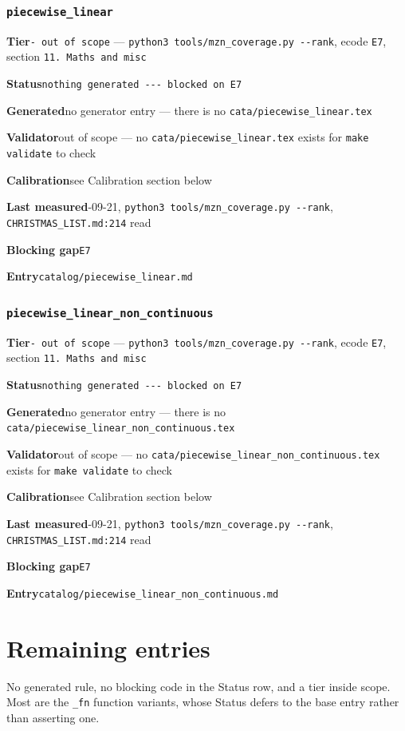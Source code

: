 \documentclass[10pt,a4paper]{article}
\newcommand{\entryfield}[2]{{\raggedright\textbf{#1}\quad #2\par}}
\begin{document}
\subsubsection*{\texttt{piecewise\_\allowbreak{}linear}}
\label{entry:piecewise-linear}
\entryfield{Tier}{\texttt{- out of scope} --- \texttt{python3 tools/\allowbreak{}mzn\_\allowbreak{}coverage.\allowbreak{}py -\allowbreak{}-\allowbreak{}rank}, ecode \texttt{E7}, section \texttt{11. Maths and misc}}
\entryfield{Status}{\texttt{nothing generated -\allowbreak{}-\allowbreak{}-\allowbreak{} blocked on E7}}
\entryfield{Generated}{no generator entry --- there is no \texttt{cata/\allowbreak{}piecewise\_\allowbreak{}linear.\allowbreak{}tex}}
\entryfield{Validator}{out of scope --- no \texttt{cata/\allowbreak{}piecewise\_\allowbreak{}linear.\allowbreak{}tex} exists for \texttt{make validate} to check}
\entryfield{Calibration}{see Calibration section below}
\entryfield{Last measured}{2026-09-21, \texttt{python3 tools/\allowbreak{}mzn\_\allowbreak{}coverage.\allowbreak{}py -\allowbreak{}-\allowbreak{}rank}, \texttt{CHRISTMAS\_LIST.md:214} read}
\entryfield{Blocking gap}{\texttt{E7}}
\entryfield{Entry}{\texttt{catalog/piecewise\_linear.md}}
\subsubsection*{\texttt{piecewise\_\allowbreak{}linear\_\allowbreak{}non\_\allowbreak{}continuous}}
\label{entry:piecewise-linear-non-continuous}
\entryfield{Tier}{\texttt{- out of scope} --- \texttt{python3 tools/\allowbreak{}mzn\_\allowbreak{}coverage.\allowbreak{}py -\allowbreak{}-\allowbreak{}rank}, ecode \texttt{E7}, section \texttt{11. Maths and misc}}
\entryfield{Status}{\texttt{nothing generated -\allowbreak{}-\allowbreak{}-\allowbreak{} blocked on E7}}
\entryfield{Generated}{no generator entry --- there is no \texttt{cata/\allowbreak{}piecewise\_\allowbreak{}linear\_\allowbreak{}non\_\allowbreak{}continuous.\allowbreak{}tex}}
\entryfield{Validator}{out of scope --- no \texttt{cata/\allowbreak{}piecewise\_\allowbreak{}linear\_\allowbreak{}non\_\allowbreak{}continuous.\allowbreak{}tex} exists for \texttt{make validate} to check}
\entryfield{Calibration}{see Calibration section below}
\entryfield{Last measured}{2026-09-21, \texttt{python3 tools/\allowbreak{}mzn\_\allowbreak{}coverage.\allowbreak{}py -\allowbreak{}-\allowbreak{}rank}, \texttt{CHRISTMAS\_LIST.md:214} read}
\entryfield{Blocking gap}{\texttt{E7}}
\entryfield{Entry}{\texttt{catalog/piecewise\_linear\_non\_continuous.md}}
\clearpage
\section{Remaining entries}
No generated rule, no blocking code in the Status row, and a tier inside scope. Most are the \texttt{\_fn} function variants, whose Status defers to the base entry rather than asserting one.
\end{document}
